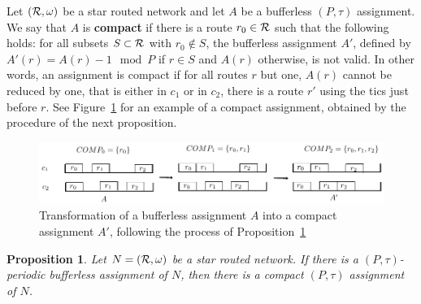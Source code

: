 \documentclass[a4paper,10pt]{journal}
\newtheorem{proposition}{Proposition}
\begin{document}
Let $({\cal R},\omega)$ be a star routed network and let $A$ be a bufferless $(P,\tau)$ assignment.
We say that $A$ is \textbf{compact} if there is a route $r_0 \in \cal{R}$ such that the following holds: for all subsets $S\subset \cal{R}$ with $r_0 \notin S$, the bufferless assignment $A'$, defined by $A'(r) = A(r) - 1 \mod P$ if $r \in S$ and $A(r)$ otherwise, is not valid. In other words, an assignment is compact if for all routes $r$ but one, $A(r)$ cannot be reduced by one, that is either in $c_1$ or in $c_2$, there is a route $r'$ using the tics just before $r$. See Figure~\ref{fig:compact} for an example of a compact assignment, obtained by the procedure of the next proposition. 
  \begin{figure}
      \begin{center} 
      \includegraphics[width=\textwidth]{compacttoassignment.pdf}
      \end{center}
      \caption{Transformation of a bufferless assignment $A$ into a compact assignment $A'$, following the process of Proposition~\ref{prop:compactification}}
      \label{fig:compact}
      \end{figure}
\begin{proposition}\label{prop:compactification}
Let $N = ({\cal R}, \omega)$ be a star routed network. If there is a $(P,\tau)$-periodic bufferless assignment of $N$, then there is a compact $(P,\tau)$ assignment of $N$.
\end{proposition}
\end{document}
